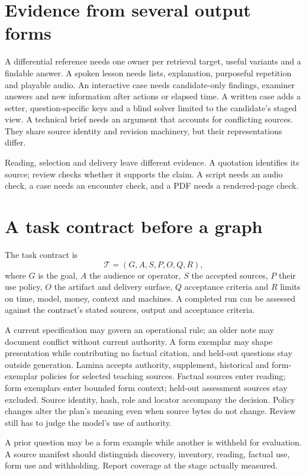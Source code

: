 \documentclass[11pt,letterpaper]{article}
\begin{document}
\section{Evidence from several output forms}
A differential reference needs one owner per retrieval target, useful variants and a findable answer. A spoken lesson needs lists, explanation, purposeful repetition and playable audio. An interactive case needs candidate-only findings, examiner answers and new information after actions or elapsed time. A written case adds a setter, question-specific keys and a blind solver limited to the candidate's staged view. A technical brief needs an argument that accounts for conflicting sources. They share source identity and revision machinery, but their representations differ.

Reading, selection and delivery leave different evidence. A quotation identifies its source; review checks whether it supports the claim. A script needs an audio check, a case needs an encounter check, and a PDF needs a rendered-page check.

\section{A task contract before a graph}
The task contract is
\begin{equation}
\mathcal{T}=(G,A,S,P,O,Q,R),
\label{eq:contract}
\end{equation}
where $G$ is the goal, $A$ the audience or operator, $S$ the accepted sources, $P$ their use policy, $O$ the artifact and delivery surface, $Q$ acceptance criteria and $R$ limits on time, model, money, context and machines. A completed run can be assessed against the contract's stated sources, output and acceptance criteria.

A current specification may govern an operational rule; an older note may document conflict without current authority. A form exemplar may shape presentation while contributing no factual citation, and held-out questions stay outside generation. Lamina accepts authority, supplement, historical and form-exemplar policies for selected teaching sources. Factual sources enter reading; form exemplars enter bounded form context; held-out assessment sources stay excluded. Source identity, hash, role and locator accompany the decision. Policy changes alter the plan's meaning even when source bytes do not change. Review still has to judge the model's use of authority.

A prior question may be a form example while another is withheld for evaluation. A source manifest should distinguish discovery, inventory, reading, factual use, form use and withholding. Report coverage at the stage actually measured.
\end{document}
